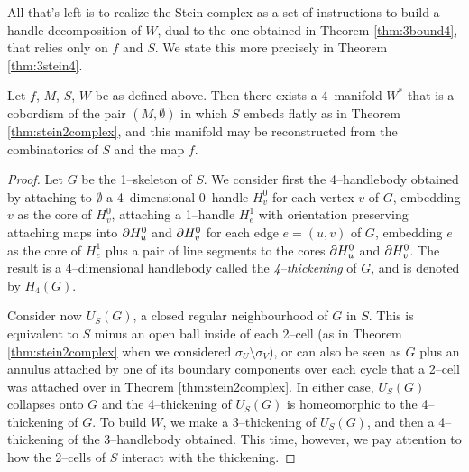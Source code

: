 All that's left is to realize the Stein complex as a set of instructions to build a handle decomposition of $W$, dual to the one obtained in Theorem \ref{thm:3bound4}, that relies only on $f$ and $S$.
We state this more precisely in Theorem \ref{thm:3stein4}.

\begin{theorem}
	\label{thm:3stein4}
	Let $f$, $M$, $S$, $W$ be as defined above.
	Then there exists a 4--manifold $W^*$ that is a cobordism of the pair $(M,\emptyset)$ in which $S$ embeds flatly as in Theorem \ref{thm:stein2complex}, and this manifold may be reconstructed from the combinatorics of $S$ and the map $f$.
\end{theorem}

\begin{proof}
	Let $G$ be the 1--skeleton of $S$.
	We consider first the 4--handlebody obtained by attaching to $\emptyset$ a 4--dimensional 0--handle $H_v^0$ for each vertex $v$ of $G$, embedding $v$ as the core of $H_v^0$, attaching a 1--handle $H_e^1$ with orientation preserving attaching maps into $\partial H_u^0$ and $\partial H_v^0$ for each edge $e=(u,v)$ of $G$, embedding $e$ as the core of $H_e^1$ plus a pair of line segments to the cores $\partial H_u^0$ and $\partial H_v^0$.
	The result is a 4--dimensional handlebody called the \emph{4--thickening} of $G$, and is denoted by $H_4(G)$.
	
	Consider now $U_S(G)$, a closed regular neighbourhood of $G$ in $S$.
	This is equivalent to $S$ minus an open ball inside of each 2--cell (as in Theorem \ref{thm:stein2complex} when we considered $\sigma_U\setminus\sigma_V$), or can also be seen as $G$ plus an annulus attached by one of its boundary components over each cycle that a 2--cell was attached over in Theorem \ref{thm:stein2complex}.
	In either case, $U_S(G)$ collapses onto $G$ and the 4--thickening of $U_S(G)$ is homeomorphic to the 4--thickening of $G$.
	To build $W$, we make a 3--thickening of $U_S(G)$, and then a 4--thickening of the 3--handlebody obtained.
	This time, however, we pay attention to how the 2--cells of $S$ interact with the thickening.
	

\end{proof}
